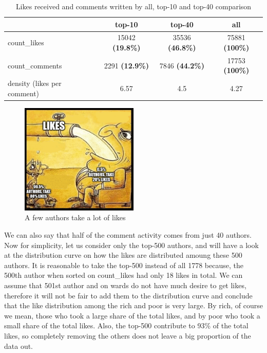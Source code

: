 \documentclass[
	12pt
] {article}
\begin{document}
	\begin{table}[H]
		\centering
		\caption{Likes received and comments written by all, top-10 and top-40 comparison}
		\label{table:basic-stats-number-likes-comments-author}
		\begin{tabular}{| p{5cm} | c | c | c |} %
			\hline
			 & top-10 & top-40 & all \\
			\hline
			count\_likes &
				\num{15042} \textbf{(\num{19.8}\%)} &
				\num{35536} \textbf{(\num{46.8}\%)} &
				\num{75881} \textbf{(\num{100}\%)} \\
			count\_comments &
				\num{2291} \textbf{(\num{12.9}\%)} &
				\num{7846} \textbf{(\num{44.2}\%)} &
				\num{17753} \textbf{(\num{100}\%)} \\
			density (likes per comment) &
				\num{6.57} &
				\num{4.5} &
				\num{4.27} \\
			\hline
		\end{tabular}
	\end{table}

	\begin{figure}[H]
		\centering
		\includegraphics[width=0.5\textwidth]{fig-small-author-take-almost-all-likes}
		\caption{A few authors take a lot of likes}
		\label{fig-small-author-take-almost-all-likes}
	\end{figure}

	We can also say that half of the comment activity comes from just 40 authors. Now for simplicity, let us consider only the top-500 authors, and will have a look at the distribution curve on how the likes are distributed amoung these 500 authors. It is reasonable to take the top-500 instead of all \num{1778} because, the 500th author when sorted on count\_likes had only 18 likes in total. We can assume that 501st author and on wards do not have much desire to get likes, therefore it will not be fair to add them to the distribution curve and conclude that the like distribution among the rich and poor is very large. By rich, of course we mean, those who took a large share of the total likes, and by poor who took a small share of the total likes. Also, the top-500 contribute to \num{93}\% of the total likes, so completely removing the others does not leave a big proportion of the data out.
\end{document}
